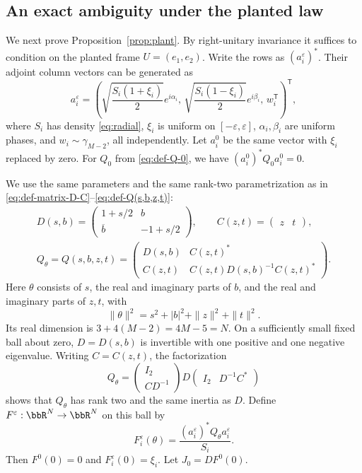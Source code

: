 \documentclass[11pt,reqno]{amsart}
\begin{document}
\subsection{An exact ambiguity under the planted law}

We next prove Proposition~\ref{prop:plant}. By right-unitary invariance it suffices to condition on the planted frame $U=(e_1,e_2)$. Write the rows as $(a_i^\varepsilon)^*$. Their adjoint column vectors can be generated as
\begin{equation}\label{eq:planted-row}
 a_i^\varepsilon=
 \left(\sqrt{\frac{S_i(1+\xi_i)}2}e^{i\alpha_i},\,
       \sqrt{\frac{S_i(1-\xi_i)}2}e^{i\beta_i},\,w_i^{\mathsf T}\right)^{\mathsf T},
\end{equation}
where $S_i$ has density \eqref{eq:radial}, $\xi_i$ is uniform on $[-\varepsilon,\varepsilon]$, $\alpha_i,\beta_i$ are uniform phases, and $w_i\sim\gamma_{M-2}$, all independently. Let $a_i^0$ be the same vector with $\xi_i$ replaced by zero. For $Q_0$ from \eqref{eq:def-Q-0}, we have $(a_i^0)^*Q_0a_i^0=0$.

We use the same parameters and the same rank-two parametrization as in \eqref{eq:def-matrix-D-C}--\eqref{eq:def-Q(s,b,z,t)}:
\begin{equation}\label{eq:chart}
\begin{gathered}
 D(s,b)=\begin{pmatrix}1+s/2&b\\\overline b&-1+s/2\end{pmatrix},
 \qquad C(z,t)=\begin{pmatrix}z&t\end{pmatrix},\\
 Q_\theta=Q(s,b,z,t)=
 \begin{pmatrix}D(s,b)&C(z,t)^*\\
 C(z,t)&C(z,t)D(s,b)^{-1}C(z,t)^*\end{pmatrix}.
\end{gathered}
\end{equation}
Here $\theta$ consists of $s$, the real and imaginary parts of $b$, and the real and imaginary parts of $z,t$, with
\[
 \|\theta\|^2=s^2+|b|^2+\|z\|^2+\|t\|^2.
\]
Its real dimension is $3+4(M-2)=4M-5=N$.
On a sufficiently small fixed ball about zero, $D=D(s,b)$ is invertible with one positive and one negative eigenvalue. Writing $C=C(z,t)$, the factorization
\[
 Q_\theta=\begin{pmatrix}I_2\\CD^{-1}\end{pmatrix}
 D\begin{pmatrix}I_2&D^{-1}C^*\end{pmatrix}
\]
shows that $Q_\theta$ has rank two and the same inertia as $D$.
Define $F^\varepsilon:\bbR^N\to\bbR^N$ on this ball by
\[
 F_i^\varepsilon(\theta)=\frac{(a_i^\varepsilon)^*Q_\theta a_i^\varepsilon}{S_i}.
\]
Then $F^0(0)=0$ and $F_i^\varepsilon(0)=\xi_i$. Let $J_0=DF^0(0)$.
\end{document}
